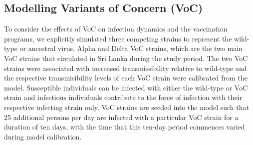 \subsection{Modelling Variants of Concern (VoC)}
To consider the effects of VoC on infection dynamics and the vaccination programs, we explicitly simulated three competing strains to represent the wild-type or ancestral virus, Alpha and Delta VoC strains, which are the two main VoC strains that circulated in Sri Lanka during the study period. The two VoC strains were associated with increased transmissibility relative to wild-type and the respective transmisibility levels of each VoC strain were calibrated from the model. Susceptible individuals can be infected with either the wild-type or VoC strain and infectious individuals contribute to the force of infection with their respective infecting strain only. VoC strains are seeded into the model such that 25 additional persons per day are infected with a particular VoC strain for a duration of ten days, with the time that this ten-day period commences varied during model calibration.